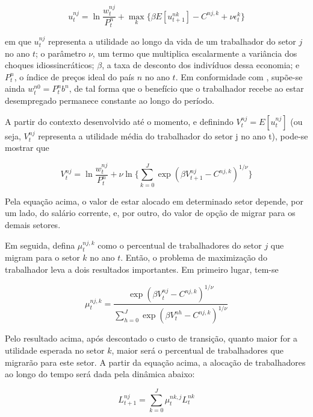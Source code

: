 \documentclass{article}
\begin{document}
\begin{equation}
    u_t^{nj} = \ln \frac{w_t^{nj}}{P_t^n} + \max_{k} \{ \beta E[u_{t+1}^{nk} ] - C^{nj,k} + \nu \epsilon_t^k \} 
\end{equation}

em que $u_t^{nj}$ representa a utilidade ao longo da vida de um trabalhador do setor $j$ no ano $t$; o parâmetro $\nu$, um termo que multiplica escalarmente a variância dos choques idiossincráticos; $\beta$, a taxa de desconto dos indivíduos dessa economia; e $P_t^n$, o índice de preços ideal do país $n$ no ano $t$. Em conformidade com \textcite{caliendo}, supõe-se ainda $w_t^{n0}=P_t^n b^n$, de tal forma que o benefício que o trabalhador recebe ao estar desempregado permanece constante ao longo do período. 

A partir do contexto desenvolvido até o momento, e definindo $V_t^{nj}=E[u_t^{nj} ]$ (ou seja, $V_t^{nj}$ representa a utilidade média do trabalhador do setor j no ano t), pode-se mostrar que 

\begin{equation}
    V_t^{nj} = \ln \frac{w_t^{nj}}{P_t^n} + \nu \ln \{ \sum_{k=0}^J \exp (\beta V_{t+1}^{nj} - C^{nj,k} ) ^ {1/\nu}  \}
\end{equation}

Pela equação acima, o valor de estar alocado em determinado setor depende, por um lado, do salário corrente, e, por outro, do valor de opção de migrar para os demais setores.

Em seguida, defina $\mu_t^{nj,k}$ como o percentual de trabalhadores do setor $j$ que migram para o setor $k$ no ano $t$. Então, o problema de maximização do trabalhador leva a dois resultados importantes. Em primeiro lugar, tem-se

\begin{equation}
    \mu_t^{nj,k} = \frac{ \exp (\beta V_t^{nj} - C^{nj,k}) ^ {1/ \nu} }{ \sum_{h=0}^J \exp (\beta V_t^{nh} - C^{nj,k}) ^ {1/ \nu} }
\end{equation}

Pelo resultado acima, após descontado o custo de transição, quanto maior for a utilidade esperada no setor $k$, maior será o percentual de trabalhadores que migrarão para este setor. A partir da equação acima, a alocação de trabalhadores ao longo do tempo será dada pela dinâmica abaixo:

\begin{equation}
    L_{t+1}^{nj} = \sum_{k=0}^J \mu_t^{nk,j}L_t^{nk}
\end{equation}
\end{document}

